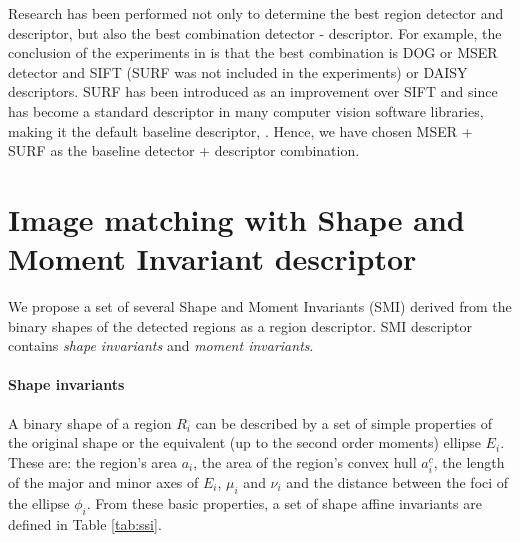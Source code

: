 \documentclass[a4paper,11pt]{article}
\begin{document}
Research has been performed not only to determine the best region detector and descriptor, but also the best combination detector - descriptor.
For example, the conclusion of the experiments in \cite{DahlAP11} is that the best combination is DOG or MSER detector and SIFT (SURF was not included in the experiments) or DAISY descriptors. SURF has been introduced as an improvement over SIFT and since has become a standard descriptor in many computer vision software libraries, making it the default baseline descriptor, \cite{Bay2008}.
Hence, we have chosen MSER + SURF as the baseline detector + descriptor combination.

\section{Image matching with Shape and Moment Invariant descriptor}
We propose a set of several Shape and Moment Invariants (SMI) derived from the binary shapes of the detected regions as a region descriptor. SMI descriptor contains {\em shape invariants} and {\em moment invariants}.

\paragraph{Shape invariants}
A binary shape of a region $R_i$ can be described by a set of simple properties of the original shape or the equivalent (up to the second order moments) ellipse $E_i$. These are: the region's area $a_i$, the area of the region's convex hull $a^c_i$, the length of the major and minor axes of $E_i$, $\mu_i$ and $\nu_i$ and the distance between the foci of the ellipse $\phi_i$. From these basic properties, a set of shape affine invariants are defined in Table \ref{tab:ssi}.   
\end{document}
